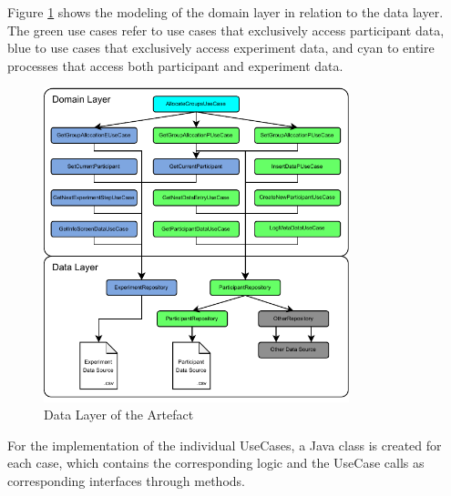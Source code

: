 Figure \ref{fig:domainLayer} shows the modeling of the domain layer in relation to the data layer. The green use cases refer to use cases that exclusively access participant data, blue to use cases that exclusively access experiment data, and cyan to entire processes that access both participant and experiment data.

\begin{figure}[htbp]
    \centering
    \includegraphics[width=0.79\textwidth, keepaspectratio]{content/05_design_and_dev_artefacts/DomainLayer.drawio.pdf}
    \caption{Data Layer of the Artefact}    
    \label{fig:domainLayer}
\end{figure}

For the implementation of the individual UseCases, a Java class is created for each case, which contains the corresponding logic and the UseCase calls as corresponding interfaces through methods.








